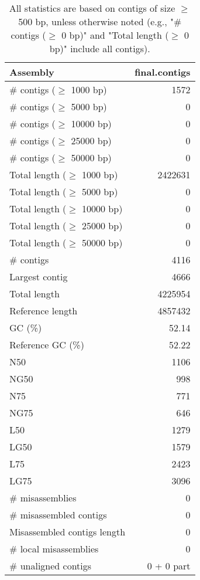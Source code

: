 \documentclass[12pt,a4paper]{article}
\begin{document}
\begin{table}[ht]
\begin{center}
\caption{All statistics are based on contigs of size $\geq$ 500 bp, unless otherwise noted (e.g., "\# contigs ($\geq$ 0 bp)" and "Total length ($\geq$ 0 bp)" include all contigs).}
\begin{tabular}{|l*{1}{|r}|}
\hline
Assembly & final.contigs \\ \hline
\# contigs ($\geq$ 1000 bp) & 1572 \\ \hline
\# contigs ($\geq$ 5000 bp) & 0 \\ \hline
\# contigs ($\geq$ 10000 bp) & 0 \\ \hline
\# contigs ($\geq$ 25000 bp) & 0 \\ \hline
\# contigs ($\geq$ 50000 bp) & 0 \\ \hline
Total length ($\geq$ 1000 bp) & 2422631 \\ \hline
Total length ($\geq$ 5000 bp) & 0 \\ \hline
Total length ($\geq$ 10000 bp) & 0 \\ \hline
Total length ($\geq$ 25000 bp) & 0 \\ \hline
Total length ($\geq$ 50000 bp) & 0 \\ \hline
\# contigs & 4116 \\ \hline
Largest contig & 4666 \\ \hline
Total length & 4225954 \\ \hline
Reference length & 4857432 \\ \hline
GC (\%) & 52.14 \\ \hline
Reference GC (\%) & 52.22 \\ \hline
N50 & 1106 \\ \hline
NG50 & 998 \\ \hline
N75 & 771 \\ \hline
NG75 & 646 \\ \hline
L50 & 1279 \\ \hline
LG50 & 1579 \\ \hline
L75 & 2423 \\ \hline
LG75 & 3096 \\ \hline
\# misassemblies & 0 \\ \hline
\# misassembled contigs & 0 \\ \hline
Misassembled contigs length & 0 \\ \hline
\# local misassemblies & 0 \\ \hline
\# unaligned contigs & 0 + 0 part \\ \hline

\end{tabular}
\end{center}
\end{table}
\end{document}
